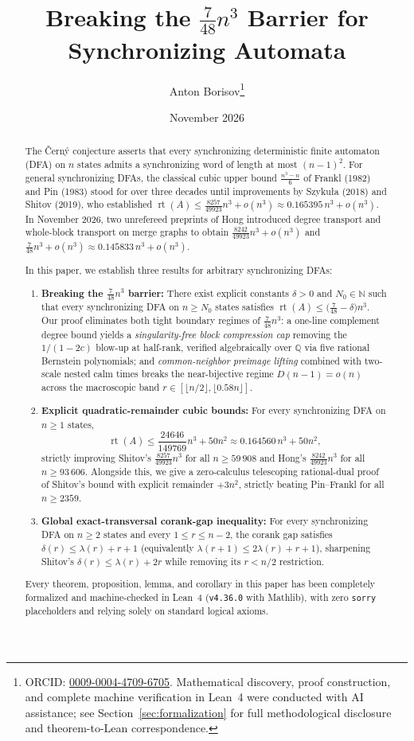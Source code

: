 \documentclass[11pt]{article}
\title{Breaking the $\frac{7}{48} n^3$ Barrier for Synchronizing Automata}
\author{Anton Borisov\thanks{ORCID: \href{https://orcid.org/0009-0004-4709-6705}{0009-0004-4709-6705}. Mathematical discovery, proof construction, and complete machine verification in Lean~4 were conducted with AI assistance; see Section~\ref{sec:formalization} for full methodological disclosure and theorem-to-Lean correspondence.}}
\date{November 2026}
\theoremstyle{definition}
\theoremstyle{remark}
\newcommand{\Q}{\mathbb{Q}}
\newcommand{\N}{\mathbb{N}}
\begin{document}
\maketitle

\begin{abstract}
The \v{C}ern\'y conjecture asserts that every synchronizing deterministic finite automaton (DFA) on $n$ states admits a synchronizing word of length at most $(n-1)^2$. For general synchronizing DFAs, the classical cubic upper bound $\frac{n^3 - n}{6}$ of Frankl (1982) and Pin (1983) stood for over three decades until improvements by Szyku\l a (2018) and Shitov (2019), who established $\operatorname{rt}(A) \le \frac{8257}{49923} n^3 + o(n^3) \approx 0.165395\, n^3 + o(n^3)$. In November 2026, two unrefereed preprints of Hong introduced degree transport and whole-block transport on merge graphs to obtain $\frac{8242}{49923} n^3 + o(n^3)$ and $\frac{7}{48} n^3 + o(n^3) \approx 0.145833\, n^3 + o(n^3)$.

In this paper, we establish three results for arbitrary synchronizing DFAs:
\begin{enumerate}[label=(\arabic*), leftmargin=2em]
  \item \textbf{Breaking the $\frac{7}{48} n^3$ barrier:} There exist explicit constants $\delta > 0$ and $N_0 \in \N$ such that every synchronizing DFA on $n \ge N_0$ states satisfies $\operatorname{rt}(A) \le \bigl(\frac{7}{48} - \delta\bigr) n^3$. Our proof eliminates both tight boundary regimes of $\frac{7}{48} n^3$: a one-line complement degree bound yields a \emph{singularity-free block compression cap} removing the $1/(1-2c)$ blow-up at half-rank, verified algebraically over $\Q$ via five rational Bernstein polynomials; and \emph{common-neighbor preimage lifting} combined with two-scale nested calm times breaks the near-bijective regime $D(n-1) = o(n)$ across the macroscopic band $r \in [\lfloor n/2 \rfloor, \lfloor 0.58 n \rfloor]$.
  \item \textbf{Explicit quadratic-remainder cubic bounds:} For every synchronizing DFA on $n \ge 1$ states,
  \[
    \operatorname{rt}(A) \le \frac{24646}{149769} n^3 + 50 n^2 \approx 0.164560\, n^3 + 50 n^2,
  \]
  strictly improving Shitov's $\frac{8257}{49923} n^3$ for all $n \ge 59\,908$ and Hong's $\frac{8242}{49923} n^3$ for all $n \ge 93\,606$. Alongside this, we give a zero-calculus telescoping rational-dual proof of Shitov's bound with explicit remainder $+3n^2$, strictly beating Pin--Frankl for all $n \ge 2359$.
  \item \textbf{Global exact-transversal corank-gap inequality:} For every synchronizing DFA on $n \ge 2$ states and every $1 \le r \le n - 2$, the corank gap satisfies $\delta(r) \le \lambda(r) + r + 1$ (equivalently $\lambda(r+1) \le 2\lambda(r) + r + 1$), sharpening Shitov's $\delta(r) \le \lambda(r) + 2r$ while removing its $r < n/2$ restriction.
\end{enumerate}
Every theorem, proposition, lemma, and corollary in this paper has been completely formalized and machine-checked in Lean~4 (\texttt{v4.36.0} with Mathlib), with zero \texttt{sorry} placeholders and relying solely on standard logical axioms.
\end{abstract}
\end{document}
